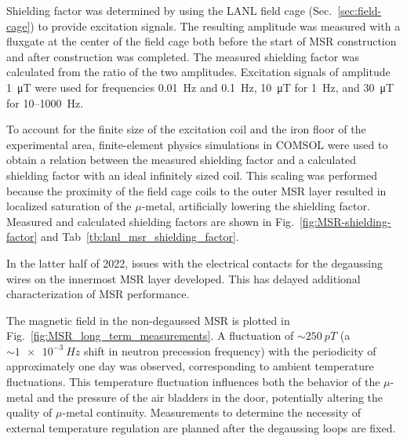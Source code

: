 Shielding factor was determined by using the LANL field cage (Sec.~\ref{sec:field-cage}) to provide excitation signals. The resulting amplitude was measured with a fluxgate at the center of the field cage both before the start of MSR construction and after construction was completed. The measured shielding factor was calculated from the ratio of the two amplitudes. Excitation signals of amplitude \qty{1}{\micro\tesla} were used for frequencies \qty{0.01}{\hertz} and \qty{0.1}{\hertz}, \qty{10}{\micro\tesla} for \qty{1}{\hertz}, and \qty{30}{\micro\tesla} for 10--\qty{1000}{\hertz}. 

To account for the finite size of the excitation coil and the iron floor of the experimental area, finite-element physics simulations in COMSOL were used to obtain a relation between the measured shielding factor and a calculated shielding factor with an ideal infinitely sized coil. This scaling was performed because the proximity of the field cage coils to the outer MSR layer resulted in localized saturation of the $\mu$-metal, artificially lowering the shielding factor. Measured and calculated shielding factors are shown in Fig.~\ref{fig:MSR-shielding-factor} and Tab~\ref{tb:lanl_msr_shielding_factor}. 

In the latter half of 2022, issues with the electrical contacts for the degaussing wires on the innermost MSR layer developed. This has delayed additional characterization of MSR performance. 

The magnetic field in the non-degaussed MSR is plotted in Fig.~\ref{fig:MSR_long_term_measurements}. A fluctuation of $\sim\qty{250}{pT}$ (a $\sim \qty{1e-3}{Hz}$ shift in neutron precession frequency) with the periodicity of approximately one day was observed, corresponding to ambient temperature fluctuations. This temperature fluctuation influences both the behavior of the $\mu$-metal and the pressure of the air bladders in the door, potentially altering the quality of $\mu$-metal continuity. Measurements to determine the necessity of external temperature regulation are planned after the degaussing loops are fixed. 

